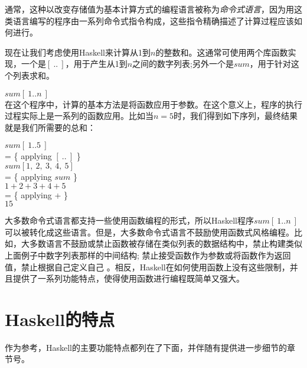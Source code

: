 通常，这种以改变存储值为基本计算方式的编程语言被称为\textit{命令式语言}，因为用这类语言编写的程序由一系列命令式指令构成，这些指令精确描述了计算过程应该如何进行。

现在让我们考虑使用Haskell来计算从1到$n$的整数和。这通常可使用两个库函数实现，一个是$[~..~]$，用于产生从1到$n$之间的数字列表;另外一个是$sum$，用于针对这个列表求和。 

\noindent\hspace*{1cm} $sum [~1..n~]$\\

在这个程序中，计算的基本方法是将函数应用于参数。在这个意义上，程序的执行过程实际上是一系列的函数应用。比如当$n
= 5$时，我们得到如下序列，最终结果就是我们所需要的总和：

\noindent\hspace*{1cm} $sum [~1..5~]$\\
\hspace*{1cm} = \{ applying $[~..~]$ \}\\
\hspace*{1cm} $sum [1,~2,~3,~4,~5]$\\
\hspace*{1cm} = \{ applying $sum$ \}\\
\hspace*{1cm} $1+2+3+4+5$\\
\hspace*{1cm} = \{ applying + \}\\
\hspace*{1cm} $15$

大多数命令式语言都支持一些使用函数编程的形式，所以Haskell程序$sum
[~1..n~]$可以被转化成这些语言。但是，大多数命令式语言不鼓励使用函数式风格编程。比如，大多数语言不鼓励或禁止函数被存储在类似列表的数据结构中，禁止构建类似上面例子中数字列表那样的中间结构;
禁止接受函数作为参数或将函数作为返回值，禁止根据自己定义自己 。相反，Haskell在如何使用函数上没有这些限制，并且提供了一系列功能特点，使得使用函数进行编程既简单又强大。

\section{Haskell的特点}
作为参考，Haskell的主要功能特点都列在了下面，并伴随有提供进一步细节的章节号。

